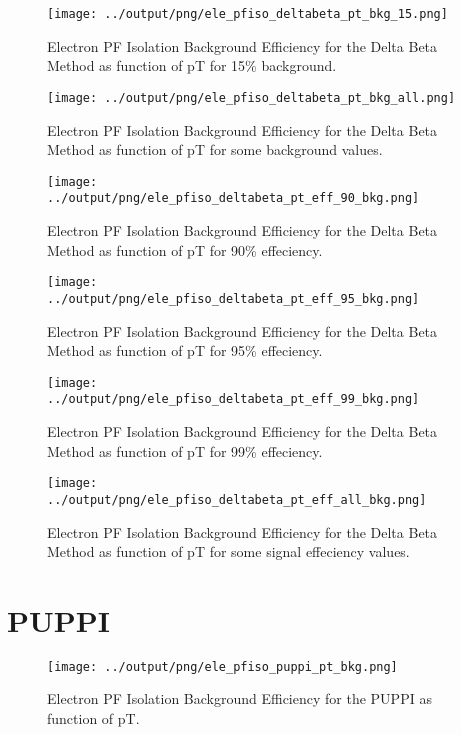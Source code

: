 \documentclass[11pt]{book}
\begin{document}
\begin{figure}[htb]
\centering
\texttt{[image: ../output/png/ele\_pfiso\_deltabeta\_pt\_bkg\_15.png]}
\caption{Electron PF Isolation Background Efficiency for the Delta Beta Method as function of pT for 15\% background.}
\label{fig:ele_pfiso_pt_bkg_deltabeta_bkg_15}
\end{figure}

\begin{figure}[htb]
\centering
\texttt{[image: ../output/png/ele\_pfiso\_deltabeta\_pt\_bkg\_all.png]}
\caption{Electron PF Isolation Background Efficiency for the Delta Beta Method as function of pT for some background values.}
\label{fig:ele_pfiso_pt_bkg_deltabeta_bkg_all}
\end{figure}

\begin{figure}[htb]
\centering
\texttt{[image: ../output/png/ele\_pfiso\_deltabeta\_pt\_eff\_90\_bkg.png]}
\caption{Electron PF Isolation Background Efficiency for the Delta Beta Method as function of pT for 90\% effeciency.}
\label{fig:ele_pfiso_pt_eff_deltabeta_eff_90_bkg}
\end{figure}

\begin{figure}[htb]
\centering
\texttt{[image: ../output/png/ele\_pfiso\_deltabeta\_pt\_eff\_95\_bkg.png]}
\caption{Electron PF Isolation Background Efficiency for the Delta Beta Method as function of pT for 95\% effeciency.}
\label{fig:ele_pfiso_pt_eff_deltabeta_eff_95_bkg}
\end{figure}

\begin{figure}[htb]
\centering
\texttt{[image: ../output/png/ele\_pfiso\_deltabeta\_pt\_eff\_99\_bkg.png]}
\caption{Electron PF Isolation Background Efficiency for the Delta Beta Method as function of pT for 99\% effeciency.}
\label{fig:ele_pfiso_pt_eff_deltabeta_eff_99_bkg}
\end{figure}

\begin{figure}[htb]
\centering
\texttt{[image: ../output/png/ele\_pfiso\_deltabeta\_pt\_eff\_all\_bkg.png]}
\caption{Electron PF Isolation Background Efficiency for the Delta Beta Method as function of pT for some signal effeciency values.}
\label{fig:ele_pfiso_pt_eff_deltabeta_eff_all_bkg}
\end{figure}
\clearpage

\section{PUPPI}
\begin{figure}[htb]
\centering
\texttt{[image: ../output/png/ele\_pfiso\_puppi\_pt\_bkg.png]}
\caption{Electron PF Isolation Background Efficiency for the PUPPI as function of pT.}
\label{fig:ele_pfiso_pt_bkg_puppi}
\end{figure}
\end{document}
